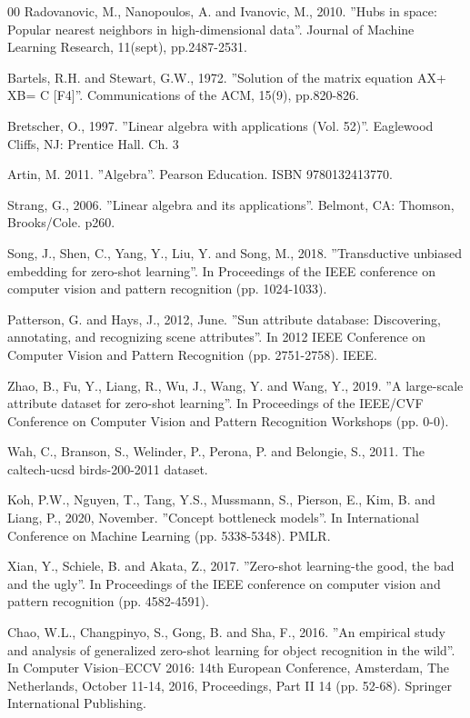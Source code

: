\documentclass{article}
\begin{document}
\begin{thebibliography}{00}
 Radovanovic, M., Nanopoulos, A. and Ivanovic, M., 2010. ''Hubs in space: Popular nearest neighbors in high-dimensional data''. Journal of Machine Learning Research, 11(sept), pp.2487-2531.

 Bartels, R.H. and Stewart, G.W., 1972. ''Solution of the matrix equation AX+ XB= C [F4]''. Communications of the ACM, 15(9), pp.820-826.

 Bretscher, O., 1997. ''Linear algebra with applications (Vol. 52)''. Eaglewood Cliffs, NJ: Prentice Hall. Ch. 3

 Artin, M. 2011. ''Algebra''. Pearson Education. ISBN 9780132413770.  

 Strang, G., 2006. ''Linear algebra and its applications''. Belmont, CA: Thomson, Brooks/Cole. p260.

 Song, J., Shen, C., Yang, Y., Liu, Y. and Song, M., 2018. ''Transductive unbiased embedding for zero-shot learning''. In Proceedings of the IEEE conference on computer vision and pattern recognition (pp. 1024-1033).

 Patterson, G. and Hays, J., 2012, June. ''Sun attribute database: Discovering, annotating, and recognizing scene attributes''. In 2012 IEEE Conference on Computer Vision and Pattern Recognition (pp. 2751-2758). IEEE.

 Zhao, B., Fu, Y., Liang, R., Wu, J., Wang, Y. and Wang, Y., 2019. ''A large-scale attribute dataset for zero-shot learning''. In Proceedings of the IEEE/CVF Conference on Computer Vision and Pattern Recognition Workshops (pp. 0-0).

 Wah, C., Branson, S., Welinder, P., Perona, P. and Belongie, S., 2011. The caltech-ucsd birds-200-2011 dataset.

 Koh, P.W., Nguyen, T., Tang, Y.S., Mussmann, S., Pierson, E., Kim, B. and Liang, P., 2020, November. ''Concept bottleneck models''. In International Conference on Machine Learning (pp. 5338-5348). PMLR.

 Xian, Y., Schiele, B. and Akata, Z., 2017. ''Zero-shot learning-the good, the bad and the ugly''. In Proceedings of the IEEE conference on computer vision and pattern recognition (pp. 4582-4591).

 Chao, W.L., Changpinyo, S., Gong, B. and Sha, F., 2016. ''An empirical study and analysis of generalized zero-shot learning for object recognition in the wild''. In Computer Vision–ECCV 2016: 14th European Conference, Amsterdam, The Netherlands, October 11-14, 2016, Proceedings, Part II 14 (pp. 52-68). Springer International Publishing.


\end{thebibliography}
\end{document}

